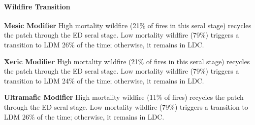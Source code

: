 \paragraph{Wildfire Transition}
\begin{adjustwidth}{2cm}{}
\textbf{Mesic Modifier } High mortality wildfire (21\% of fires in this seral stage) recycles the patch through the ED seral stage. Low mortality wildfire (79\%) triggers a transition to LDM 26\% of the time; otherwise, it remains in LDC.

\medskip
\noindent \textbf{Xeric Modifier} High mortality wildfire (21\% of fires in this seral stage) recycles the patch through the ED seral stage. Low mortality wildfire (79\%) triggers a transition to LDM 24\% of the time; otherwise, it remains in LDC.

\medskip
\noindent \textbf{Ultramafic Modifier} High mortality wildfire (11\% of fires) recycles the patch through the ED seral stage. Low mortality wildfire (79\%) triggers a transition to LDM 26\% of the time; otherwise, it remains in LDC.

\end{adjustwidth}
\noindent\hrulefill

\newpage

